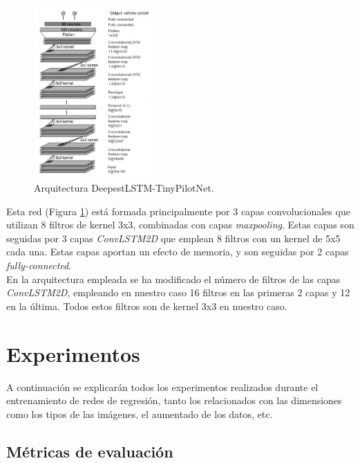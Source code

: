 \begin{figure}
\begin{center}
	\includegraphics[width=0.4\textwidth]{figures/Regresion/deepestlstm_tinypilotnet.png}
   \caption{Arquitectura DeepestLSTM-TinyPilotNet.}
	\label{fig.DeepestLstm_TinyPilotNet}
\end{center}
\end{figure}

Esta red (Figura \ref{fig.DeepestLstm_TinyPilotNet}) está formada principalmente por 3 capas convolucionales que utilizan 8 filtros de kernel 3x3, combinadas con capas \textit{maxpooling}. Estas capas son seguidas por 3 capas \textit{ConvLSTM2D} que emplean 8 filtros con un kernel de 5x5 cada una. Estas capas aportan un efecto de memoria, y son seguidas por 2 capas \textit{fully-connected}.\\

En la arquitectura empleada se ha modificado el número de filtros de las capas \textit{ConvLSTM2D}, empleando en nuestro caso 16 filtros en las primeras 2 capas y 12 en la última. Todos estos filtros son de kernel 3x3 en nuestro caso.\\



\section{Experimentos}

A continuación se explicarán todos los experimentos realizados durante el entrenamiento de redes de regresión, tanto los relacionados con las dimensiones como los tipos de las imágenes, el aumentado de los datos, etc. \\

\subsection{Métricas de evaluación}\label{metricas_reg}


